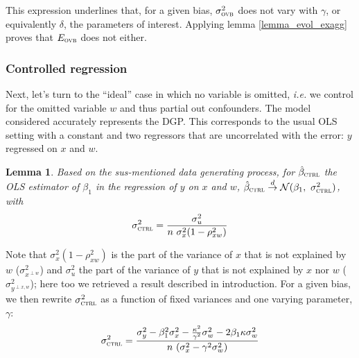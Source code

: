 \documentclass[usletter, 12pt]{article}
\newtheorem{lemma}{Lemma}
\begin{document}
			 This expression underlines that, for a given bias,  $\sigma_{\textsc{ovb}}^{2}$ does not vary with $\gamma$, or equivalently $\delta$, the parameters of interest. Applying lemma \ref{lemma_evol_exagg} proves that $E_{\textsc{ovb}}$ does not either.

			
			\subsubsection{Controlled regression}
			
				Next, let's turn to the ``ideal'' case in which no variable is omitted, \textit{i.e.} we control for the omitted variable $w$ and thus partial out confounders. The model considered accurately represents the DGP.
%				
				This corresponds to the usual OLS setting with a constant and two regressors that are uncorrelated with the error: $y$ regressed on $x$ and $w$.
						
				\begin{lemma}\label{lemma_ctrl}
					Based on the sus-mentioned data generating process, for $\hat{\beta}_{\textsc{ctrl}}$ the OLS estimator of $\beta_{1}$ in the regression of $y$ on $x$ and $w$, $\hat{\beta}_{\textsc{ctrl}} \overset{d}{\to} \mathcal{N}(\beta_{1}, \ \sigma_{\textsc{ctrl}}^{2})$, with
					\[
						\sigma_{\textsc{ctrl}}^{2} = \dfrac{\sigma_{u}^{2}}{n \ \sigma_{x}^{2} (1 - \rho_{xw}^{2})}
					\]
				\end{lemma}
				
				Note that $\sigma_{x}^{2} (1 - \rho_{xw}^{2})$ is the part of the variance of $x$ that is not explained by $w$ ($\sigma^{2}_{x^{\perp w}}$) and $\sigma_{u}^{2}$ the part of the variance of $y$ that is not explained by $x$ nor $w$ ($\sigma^{2}_{y^{\perp x, w}}$); here too we retrieved a result described in introduction. For a given bias, we then rewrite $\sigma_{\textsc{ctrl}}^{2}$ as a function of fixed variances and one varying parameter, $\gamma$:
				~
				\[
					\sigma_{\textsc{ctrl}}^{2} = \dfrac{\sigma_{y}^{2} - \beta_{1}^{2}\sigma_{x}^{2} - \frac{\kappa^{2}}{\gamma^{2}}\sigma_{w}^{2} - 2\beta_{1}\kappa \sigma_{w}^{2}}{n \ (\sigma_{x}^{2}  - \gamma^{2} \sigma_{w}^{2})}
				\]
				
\end{document}
